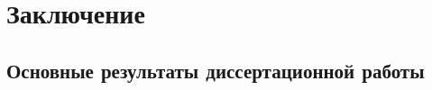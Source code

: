 \chapter*{Заключение}                       %


\section*{Основные результаты диссертационной работы}

%
